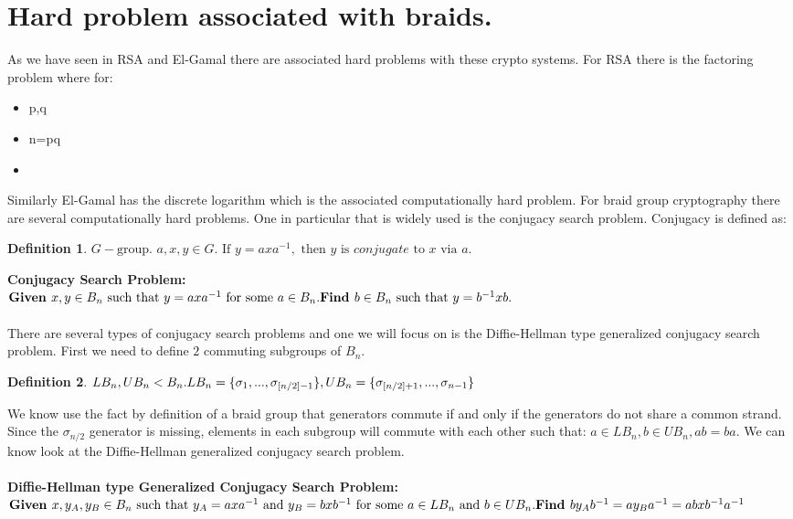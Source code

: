 \documentclass{article}
\theoremstyle{definition}
\newtheorem{definition}{Definition}[section]
\begin{document}
	 
	\section{Hard problem associated with braids.}
	As we have seen in RSA and El-Gamal there are associated hard problems with these crypto systems. For RSA there is the factoring problem where for:
	
	\begin{itemize}
		\item p,q 
		\item n=pq 
		\item {} 
	\end{itemize}

Similarly El-Gamal has the discrete logarithm which is the associated computationally hard problem. 
For braid group cryptography there are several computationally hard problems. One in particular that is widely used is the conjugacy search problem. Conjugacy is defined as:
\begin{definition} 
$G-\text{group. } a,x,y \in G. \text{ If }y=axa^{-1},\text{ then }y \text{ is } conjugate \text{ to }x \text{ via }a.$
\end{definition}

\noindent \textbf{Conjugacy Search Problem:} \\ $\textbf{Given }x,y \in B_n \text{ such that }y=axa^{-1} \text{ for some }a \in B_n. \\ \textbf{Find }b \in B_n \text{ such that }y=b^{-1}xb.$
\\ \\
There are several types of conjugacy search problems and one we will focus on is the Diffie-Hellman type generalized conjugacy search problem. First we need to define $2$ commuting subgroups of $B_n$. 


\begin{definition}
$LB_n,UB_n < B_n. \\ LB_n=\{ \sigma_1,...,\sigma_{[n/2]-1}  \}, UB_n=\{ \sigma_{[n/2]+1},...,\sigma_{n-1}  \} $
\end{definition}

We know use the fact by definition of a braid group that generators commute if and only if the generators do not share a common strand. Since the $\sigma_{n/2}$ generator is missing, elements in each subgroup will commute with each other such that: $a \in LB_n, b \in UB_n, ab=ba$. We can know look at the Diffie-Hellman generalized conjugacy search problem.
\\ \\
\textbf{Diffie-Hellman type Generalized Conjugacy Search Problem:} \\ $\textbf{Given }x,y_A, y_B \in B_n \text{ such that }y_A=axa^{-1} \text{ and } y_B=bxb^{-1} \text{ for some }a \in LB_n \text{ and }b \in UB_n. \\ \textbf{Find }by_Ab^{-1}=ay_Ba^{-1}=abxb^{-1}a^{-1}$
\end{document}
